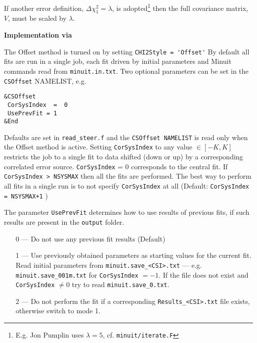 If another error definition, $\Delta\chi_1^2 = \lambda$, 
is adopted\footnote{E.g. Jon Pumplin uses $\lambda=5$, cf. \texttt{minuit/iterate.F}} then
the full covariance matrix, $V$, must be scaled by $\lambda$. 

\begin{description}
\item \bf{Implementation via \fitter\ } \rm

The Offset method is turned on by setting \verb:CHI2Style = 'Offset':
By default all fits are run in a single job, each fit driven by initial parameters and Minuit commands read from \verb'minuit.in.txt'.
Two optional parameters can be set in the \verb'CSOffset' NAMELIST, e.g.
\vspace*{-2.5ex}
\begin{verbatim}
&CSOffset
 CorSysIndex  =  0
 UsePrevFit = 1
&End
\end{verbatim}
\vspace*{-1ex}
Defaults are set in \verb'read_steer.f'
and the \verb'CSOffset NAMELIST' is read only when the Offset method is active.
Setting \verb'CorSysIndex' to any value $\in [-K, K]$ 
restricts the job to a single fit to data shifted (down or up) by a corresponding correlated error source.
\verb'CorSysIndex' = 0 corresponds to the central fit.
If \verb'CorSysIndex > NSYSMAX' then all the fits are performed.
The best way to perform all fits in a single run is 
to not specify \verb'CorSysIndex' at all 
(Default: \verb'CorSysIndex = NSYSMAX+1' )
\vspace{0.4cm}

The parameter {\tt UsePrevFit} determines how to use results of previous fits,
if such results are present in the \verb'output' folder.
\begin{enumerate}
\item [0 ---]
Do not use any previous fit results (Default)
\item [1 ---]
Use previously obtained parameters as starting values for the current fit.
Read initial parameters from \verb'minuit.save_<CSI>.txt'
 --- e.g.  \verb'minuit.save_001m.txt' for \verb'CorSysIndex' $= -1$.
If the file does not exist and \verb'CorSysIndex' $\neq 0$ try to read
\verb'minuit.save_0.txt'.
\item [2 ---]
Do not perform the fit if a corresponding \verb'Results_<CSI>.txt' file exists,
otherwise switch to mode 1.
\end{enumerate}
\end{description}

